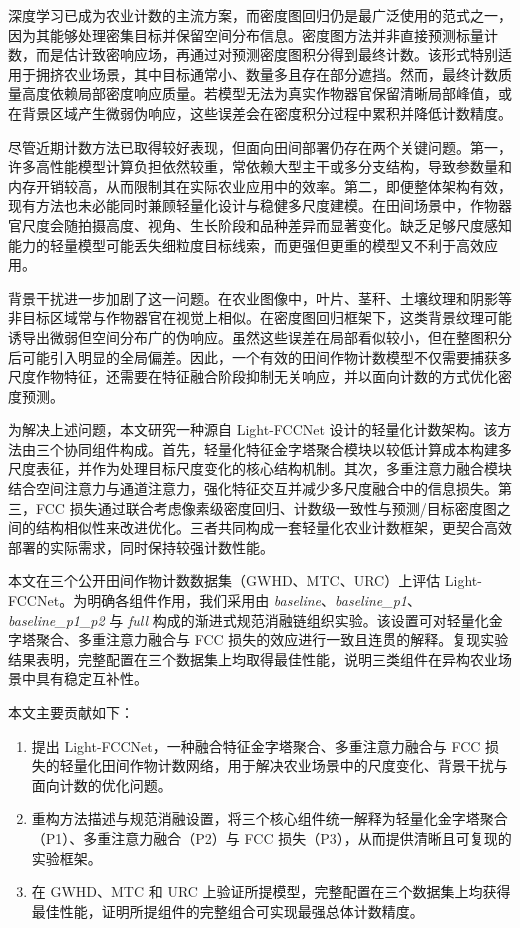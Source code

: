 \documentclass[a4paper,fleqn]{cas-sc}
\begin{document}
深度学习已成为农业计数的主流方案，而密度图回归仍是最广泛使用的范式之一，因为其能够处理密集目标并保留空间分布信息。密度图方法并非直接预测标量计数，而是估计致密响应场，再通过对预测密度图积分得到最终计数。该形式特别适用于拥挤农业场景，其中目标通常小、数量多且存在部分遮挡。然而，最终计数质量高度依赖局部密度响应质量。若模型无法为真实作物器官保留清晰局部峰值，或在背景区域产生微弱伪响应，这些误差会在密度积分过程中累积并降低计数精度。

尽管近期计数方法已取得较好表现，但面向田间部署仍存在两个关键问题。第一，许多高性能模型计算负担依然较重，常依赖大型主干或多分支结构，导致参数量和内存开销较高，从而限制其在实际农业应用中的效率。第二，即便整体架构有效，现有方法也未必能同时兼顾轻量化设计与稳健多尺度建模。在田间场景中，作物器官尺度会随拍摄高度、视角、生长阶段和品种差异而显著变化。缺乏足够尺度感知能力的轻量模型可能丢失细粒度目标线索，而更强但更重的模型又不利于高效应用。

背景干扰进一步加剧了这一问题。在农业图像中，叶片、茎秆、土壤纹理和阴影等非目标区域常与作物器官在视觉上相似。在密度图回归框架下，这类背景纹理可能诱导出微弱但空间分布广的伪响应。虽然这些误差在局部看似较小，但在整图积分后可能引入明显的全局偏差。因此，一个有效的田间作物计数模型不仅需要捕获多尺度作物特征，还需要在特征融合阶段抑制无关响应，并以面向计数的方式优化密度预测。

为解决上述问题，本文研究一种源自 Light-FCCNet 设计的轻量化计数架构。该方法由三个协同组件构成。首先，轻量化特征金字塔聚合模块以较低计算成本构建多尺度表征，并作为处理目标尺度变化的核心结构机制。其次，多重注意力融合模块结合空间注意力与通道注意力，强化特征交互并减少多尺度融合中的信息损失。第三，FCC 损失通过联合考虑像素级密度回归、计数级一致性与预测/目标密度图之间的结构相似性来改进优化。三者共同构成一套轻量化农业计数框架，更契合高效部署的实际需求，同时保持较强计数性能。

本文在三个公开田间作物计数数据集（GWHD、MTC、URC）上评估 Light-FCCNet。为明确各组件作用，我们采用由 \textit{baseline}、\textit{baseline\_p1}、\textit{baseline\_p1\_p2} 与 \textit{full} 构成的渐进式规范消融链组织实验。该设置可对轻量化金字塔聚合、多重注意力融合与 FCC 损失的效应进行一致且连贯的解释。复现实验结果表明，完整配置在三个数据集上均取得最佳性能，说明三类组件在异构农业场景中具有稳定互补性。

本文主要贡献如下：
\begin{enumerate}
    \item 提出 Light-FCCNet，一种融合特征金字塔聚合、多重注意力融合与 FCC 损失的轻量化田间作物计数网络，用于解决农业场景中的尺度变化、背景干扰与面向计数的优化问题。
    \item 重构方法描述与规范消融设置，将三个核心组件统一解释为轻量化金字塔聚合（P1）、多重注意力融合（P2）与 FCC 损失（P3），从而提供清晰且可复现的实验框架。
    \item 在 GWHD、MTC 和 URC 上验证所提模型，完整配置在三个数据集上均获得最佳性能，证明所提组件的完整组合可实现最强总体计数精度。
\end{enumerate}
\end{document}

